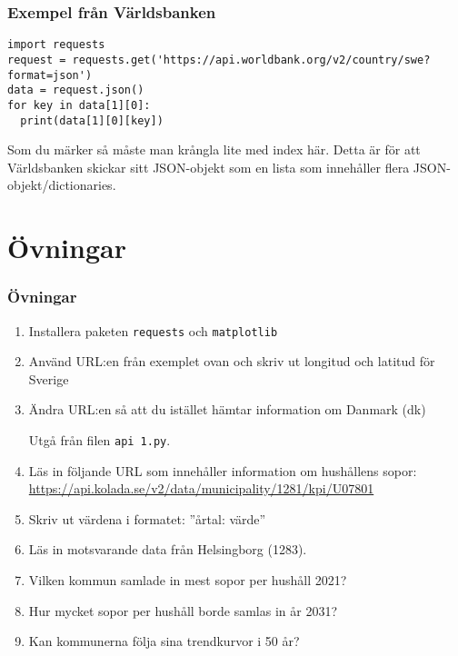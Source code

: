\documentclass[aspectratio=169]{beamer}
\begin{document}
\begin{frame}[fragile]
\frametitle{Exempel från Världsbanken}

\begin{lstlisting}
import requests
request = requests.get('https://api.worldbank.org/v2/country/swe?format=json')
data = request.json()
for key in data[1][0]:
  print(data[1][0][key])
\end{lstlisting}

Som du märker så måste man krångla lite med index här. Detta är för att Världsbanken skickar sitt JSON-objekt som en lista som innehåller flera JSON-objekt/dictionaries.

\end{frame}

\section{Övningar}

\begin{frame}
\frametitle{Övningar}

\begin{enumerate}
	\item Installera paketen \texttt{requests} och \texttt{matplotlib}
	
	\item Använd URL:en från exemplet ovan och skriv ut longitud och latitud för Sverige
	\item Ändra URL:en så att du istället hämtar information om Danmark (dk)
	
	Utgå från filen \texttt{api 1.py}.
	
	\item Läs in följande URL som innehåller information om hushållens sopor: \href{https://api.kolada.se/v2/data/municipality/1281/kpi/U07801}{https://api.kolada.se/v2/data/municipality/1281/kpi/U07801}
	\item Skriv ut värdena i formatet: ''årtal: värde''
	\item Läs in motsvarande data från Helsingborg (1283).
	\item Vilken kommun samlade in mest sopor per hushåll 2021?
	\item Hur mycket sopor per hushåll borde samlas in år 2031?
	\item Kan kommunerna följa sina trendkurvor i 50 år?
\end{enumerate}

\end{frame}
\end{document}
